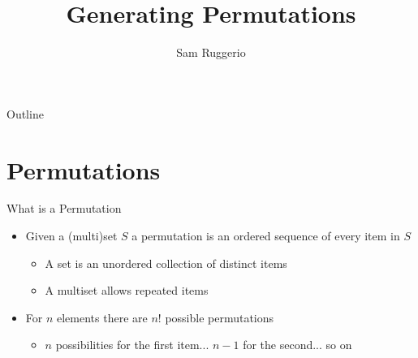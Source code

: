 \documentclass[aspectratio=169]{beamer}
\title{Generating Permutations}
\subtitle{\cite[Chapter~7.2.1.2]{TAOCP4A}}
\author{Sam Ruggerio}
\date{}
\begin{document}

\begin{frame}
\titlepage
\end{frame}

\begin{frame}{Outline}
  \tableofcontents
\end{frame}


\section{Permutations}

\frame{\sectionpage}

\begin{frame}{What is a Permutation}
\begin{itemize}
    \item Given a (multi)set $S$ a permutation is an \textcolor{sigma@mainblue}{ordered} sequence of every item in $S$ \pause
    \begin{itemize}
        \item A set is an unordered collection of distinct items
        \item A multiset allows repeated items \pause
    \end{itemize}
    \item For $n$ elements there are $n!$ possible permutations \pause
    \begin{itemize}
        \item $n$ possibilities for the first item... $n-1$ for the second... so on
    \end{itemize}
\end{itemize}
\end{frame}
\end{document}
